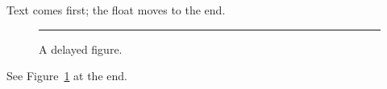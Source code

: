 \documentclass{article}
\begin{document}
Text comes first; the float moves to the end.
\begin{figure}[ht]
\centering\rule{3cm}{2cm}
\caption{A delayed figure.\label{fig:ef}}
\end{figure}
See Figure~\ref{fig:ef} at the end.
\end{document}
